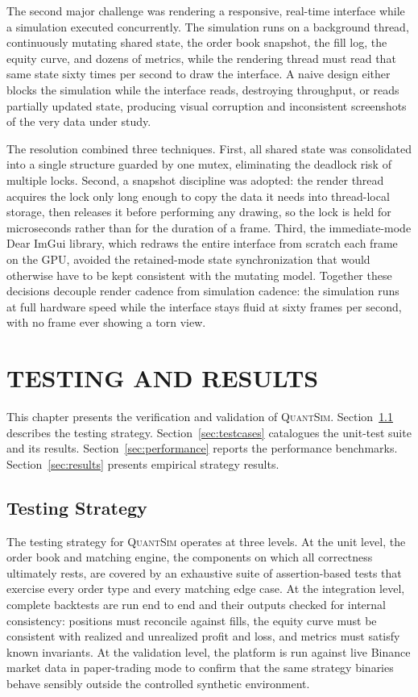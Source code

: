 \documentclass[12pt,oneside,a4paper]{report}
\newcommand{\quantsim}{\textsc{QuantSim}}
\begin{document}
The second major challenge was rendering a responsive, real-time interface while a simulation executed concurrently. The simulation runs on a background thread, continuously mutating shared state, the order book snapshot, the fill log, the equity curve, and dozens of metrics, while the rendering thread must read that same state sixty times per second to draw the interface. A naive design either blocks the simulation while the interface reads, destroying throughput, or reads partially updated state, producing visual corruption and inconsistent screenshots of the very data under study.

The resolution combined three techniques. First, all shared state was consolidated into a single structure guarded by one mutex, eliminating the deadlock risk of multiple locks. Second, a snapshot discipline was adopted: the render thread acquires the lock only long enough to copy the data it needs into thread-local storage, then releases it before performing any drawing, so the lock is held for microseconds rather than for the duration of a frame. Third, the immediate-mode Dear ImGui library, which redraws the entire interface from scratch each frame on the GPU, avoided the retained-mode state synchronization that would otherwise have to be kept consistent with the mutating model. Together these decisions decouple render cadence from simulation cadence: the simulation runs at full hardware speed while the interface stays fluid at sixty frames per second, with no frame ever showing a torn view.

\chapter{TESTING AND RESULTS}
\label{ch:testing}

This chapter presents the verification and validation of \quantsim{}. Section~\ref{sec:teststrategy} describes the testing strategy. Section~\ref{sec:testcases} catalogues the unit-test suite and its results. Section~\ref{sec:performance} reports the performance benchmarks. Section~\ref{sec:results} presents empirical strategy results.

\section{Testing Strategy}
\label{sec:teststrategy}

The testing strategy for \quantsim{} operates at three levels. At the unit level, the order book and matching engine, the components on which all correctness ultimately rests, are covered by an exhaustive suite of assertion-based tests that exercise every order type and every matching edge case. At the integration level, complete backtests are run end to end and their outputs checked for internal consistency: positions must reconcile against fills, the equity curve must be consistent with realized and unrealized profit and loss, and metrics must satisfy known invariants. At the validation level, the platform is run against live Binance market data in paper-trading mode to confirm that the same strategy binaries behave sensibly outside the controlled synthetic environment.
\end{document}
